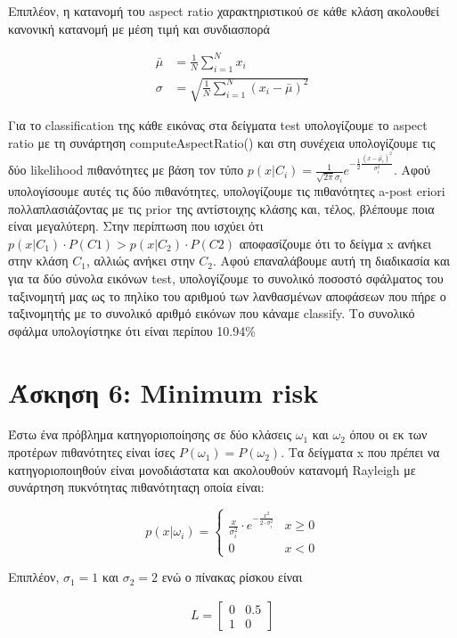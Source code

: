 \documentclass{article}
\begin{document}
	\pagebreak
	\noindent
	Επιπλέον, η κατανομή του aspect ratio χαρακτηριστικού σε κάθε κλάση ακολουθεί κανονική κατανομή με μέση τιμή και συνδιασπορά 
	
	\begin{align*}
		\bar{μ} &= \frac{1}{N} \sum_{i=1}^{N} x_{i} \\
		σ &= \sqrt{\frac{1}{N} \sum_{i=1}^{N} (x_{i} - \bar{μ})^2}
	\end{align*}	
	
	\noindent
	Για το classification της κάθε εικόνας στα δείγματα test υπολογίζουμε το aspect ratio με τη συνάρτηση computeAspectRatio() και στη συνέχεια υπολογίζουμε τις δύο likelihood πιθανότητες με βάση τον τύπο $p(x| C_{i}) = \frac{1}{\sqrt{2π} σ_{i}}e^{-\frac{1}{2}\frac{(x -\bar{μ_{i}})^{2}}{σ_{i}^{2}}}$. Αφού υπολογίσουμε αυτές τις δύο πιθανότητες, υπολογίζουμε τις πιθανότητες a-post eriori πολλαπλασιάζοντας με τις prior της αντίστοιχης κλάσης και, τέλος, βλέπουμε ποια είναι μεγαλύτερη. Στην περίπτωση που ισχύει ότι $p(x| C_{1}) \cdot P(C1) > p(x| C_{2}) \cdot P(C2)$ αποφασίζουμε ότι το δείγμα x ανήκει στην κλάση $C_{1}$, αλλιώς ανήκει στην $C_{2}$. Aφού επαναλάβουμε αυτή τη διαδικασία και για τα δύο σύνολα εικόνων test, υπολογίζουμε το συνολικό ποσοστό σφάλματος του ταξινομητή μας ως το πηλίκο του αριθμού των λανθασμένων αποφάσεων που πήρε ο ταξινομητής με το συνολικό αριθμό εικόνων που κάναμε classify. Το συνολικό σφάλμα υπολογίστηκε ότι είναι περίπου 10.94\%
	
\section*{Άσκηση 6: Minimum risk}
	Έστω ένα πρόβλημα κατηγοριοποίησης σε δύο κλάσεις $ω_1$ και $ω_2$ όπου οι εκ των προτέρων πιθανότητες είναι ίσες $P(ω_1) = P(ω_2)$. Τα δείγματα x που πρέπει να κατηγοριοποιηθούν είναι	μονοδιάστατα και ακολουθούν κατανομή Rayleigh με συνάρτηση πυκνότητας πιθανότηταςη οποία είναι: 
	
	\begin{equation*}
		p(x | ω_{{i}})=
		\begin{cases}
			\frac{x}{σ_{i}^2} \cdot e^{-\frac{x ^{2}}{2 \cdot σ_{i}^{2}}} & x \ge 0 \\
			0 & x < 0
		\end{cases}
	\end{equation*}

	\noindent
	Επιπλέον, $σ_1 = 1$ και $σ_2 = 2$ ενώ ο πίνακας ρίσκου είναι
	
	\begin{align*}
		L = 
		\begin{bmatrix}
			0 & 0.5 \\
			1 & 0
		\end{bmatrix}	
	\end{align*}
	
\end{document}
